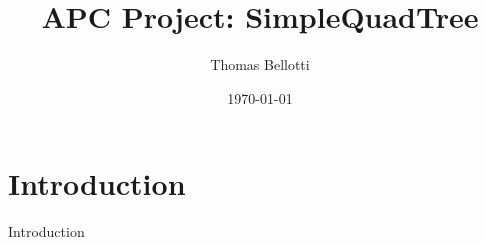 \documentclass[8pt]{beamer}
\title{APC Project: SimpleQuadTree}
\author{Thomas Bellotti}
\date{\today}
\begin{document}
\begin{frame}
 \maketitle
\end{frame}


\section{Introduction}
\begin{frame}
 \begin{center}
  \begin{huge}
   Introduction
  \end{huge}
 \end{center}
\end{frame}
\end{document}
